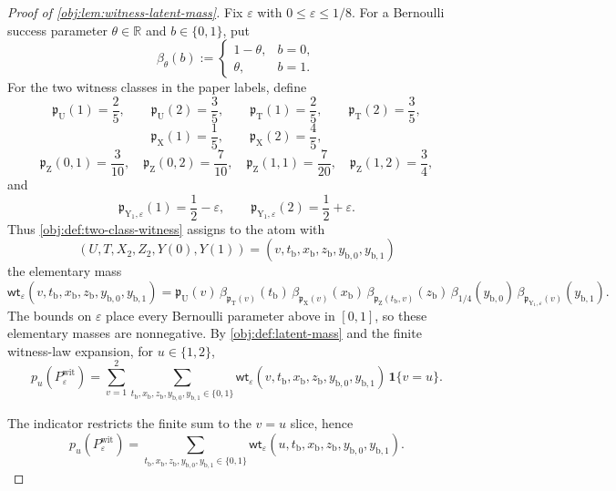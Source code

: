 \begin{proof}[Proof of \cref{obj:lem:witness-latent-mass}]
Fix \(\varepsilon\) with \(0\le \varepsilon\le 1/8\).  For a Bernoulli success
parameter \(\theta\in\mathbb R\) and \(b\in\{0,1\}\), put
\[
\beta_\theta(b):=
\begin{cases}
1-\theta,& b=0,\\
\theta,& b=1.
\end{cases}
\]
For the two witness classes in the paper labels, define
\[
\mathfrak p_{\mathrm U}(1)=\frac25,\qquad
\mathfrak p_{\mathrm U}(2)=\frac35,
\qquad
\mathfrak p_{\mathrm T}(1)=\frac25,\qquad
\mathfrak p_{\mathrm T}(2)=\frac35,
\]
\[
\mathfrak p_{\mathrm X}(1)=\frac15,\qquad
\mathfrak p_{\mathrm X}(2)=\frac45,
\]
\[
\mathfrak p_{\mathrm Z}(0,1)=\frac3{10},\quad
\mathfrak p_{\mathrm Z}(0,2)=\frac7{10},\quad
\mathfrak p_{\mathrm Z}(1,1)=\frac7{20},\quad
\mathfrak p_{\mathrm Z}(1,2)=\frac34,
\]
and
\[
\mathfrak p_{\mathrm Y_1,\varepsilon}(1)=\frac12-\varepsilon,
\qquad
\mathfrak p_{\mathrm Y_1,\varepsilon}(2)=\frac12+\varepsilon .
\]
Thus \cref{obj:def:two-class-witness} assigns to the atom with
\[
(U,T,X_2,Z_2,Y(0),Y(1))
=
(v,t_{\mathrm b},x_{\mathrm b},z_{\mathrm b},
 y_{\mathrm b,0},y_{\mathrm b,1})
\]
the elementary mass
\[
\mathsf{wt}_\varepsilon
(v,t_{\mathrm b},x_{\mathrm b},z_{\mathrm b},y_{\mathrm b,0},y_{\mathrm b,1})
=
\mathfrak p_{\mathrm U}(v)\,
\beta_{\mathfrak p_{\mathrm T}(v)}(t_{\mathrm b})\,
\beta_{\mathfrak p_{\mathrm X}(v)}(x_{\mathrm b})\,
\beta_{\mathfrak p_{\mathrm Z}(t_{\mathrm b},v)}(z_{\mathrm b})\,
\beta_{1/4}(y_{\mathrm b,0})\,
\beta_{\mathfrak p_{\mathrm Y_1,\varepsilon}(v)}(y_{\mathrm b,1}).
\]
The bounds on \(\varepsilon\) place every Bernoulli parameter above in
\([0,1]\), so these elementary masses are nonnegative.  By
\cref{obj:def:latent-mass} and the finite witness-law expansion, for
\(u\in\{1,2\}\),
\[
p_u(P_{\varepsilon}^{\mathrm{wit}})
=
\sum_{v=1}^{2}\sum_{t_{\mathrm b},x_{\mathrm b},z_{\mathrm b},
y_{\mathrm b,0},y_{\mathrm b,1}\in\{0,1\}}
\mathsf{wt}_\varepsilon
(v,t_{\mathrm b},x_{\mathrm b},z_{\mathrm b},y_{\mathrm b,0},y_{\mathrm b,1})
\,\mathbf 1\{v=u\}.
\] %

The indicator restricts the finite sum to the \(v=u\) slice, hence
\[
p_u(P_{\varepsilon}^{\mathrm{wit}})
=
\sum_{t_{\mathrm b},x_{\mathrm b},z_{\mathrm b},
y_{\mathrm b,0},y_{\mathrm b,1}\in\{0,1\}}
\mathsf{wt}_\varepsilon
(u,t_{\mathrm b},x_{\mathrm b},z_{\mathrm b},y_{\mathrm b,0},y_{\mathrm b,1}).
\] %


\end{proof}

